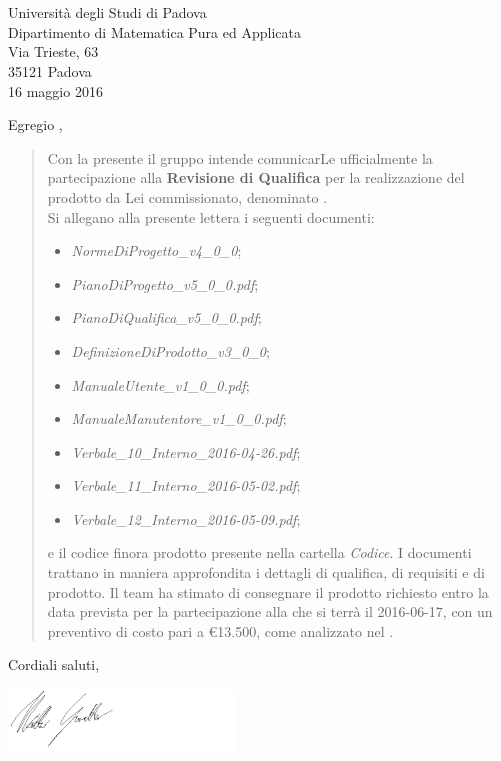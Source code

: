 \begin{letter}{\hfill \TV \\
	\hfill \RC \\
	\hfill Università degli Studi di Padova \\
	\hfill Dipartimento di Matematica Pura ed Applicata \\
	\hfill Via Trieste, 63 \\
	\hfill 35121 Padova \\
	\hfill 16 maggio 2016}

\date{}
\opening{Egregio \TV,}

	\begin{quotation}
		Con la presente il gruppo \textit{\gruppo} intende comunicarLe ufficialmente la partecipazione alla \textbf{Revisione di Qualifica} per la realizzazione del prodotto da Lei commissionato, denominato \textbf{\progetto}.
		\\
		Si allegano alla presente lettera i seguenti documenti:
		\begin{itemize}
			\item \textit{NormeDiProgetto\_v4\_0\_0};
			\item \textit{PianoDiProgetto\_v5\_0\_0.pdf};
			\item \textit{PianoDiQualifica\_v5\_0\_0.pdf};
			\item \textit{DefinizioneDiProdotto\_v3\_0\_0};
			\item \textit{ManualeUtente\_v1\_0\_0.pdf};
			\item \textit{ManualeManutentore\_v1\_0\_0.pdf};
			\item \textit{Verbale\_10\_Interno\_2016-04-26.pdf};
			\item \textit{Verbale\_11\_Interno\_2016-05-02.pdf};
			\item \textit{Verbale\_12\_Interno\_2016-05-09.pdf};
		\end{itemize}
		e il codice finora prodotto presente nella cartella \textit{Codice}.
		\newpage
		I documenti trattano in maniera approfondita i dettagli di qualifica, di requisiti e di prodotto.
		Il team ha stimato di consegnare il prodotto richiesto entro la data prevista per la partecipazione alla \RA{} che si terrà il 2016-06-17, con un preventivo di costo pari a \euro13.500, come analizzato nel \textit{\PdP}.	
	\end{quotation}
	\closing{Cordiali saluti,}
	\includegraphics[keepaspectratio = true, width=6cm]{Firma/MGR.png}


\end{letter}


